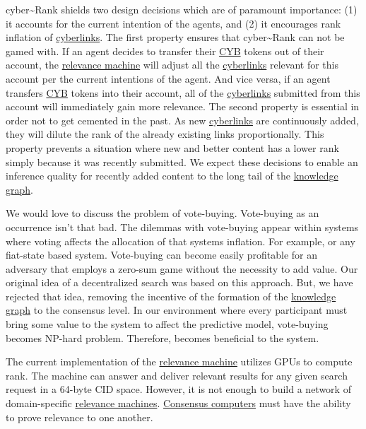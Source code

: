 \documentclass[8pt,oneside]{amsart}
\newcommand{\linkgreen}[2]{\href{#1}{\color{green}{#2}}}
\begin{document}
cyber\~{}Rank shields two design decisions which are of paramount importance: (1) it accounts for the current intention of the agents, and (2) it encourages rank inflation of {\hyperref[cyberlinks]{cyberlinks}}. The first property ensures that cyber\~{}Rank can not be gamed with. If an agent decides to transfer their {\hyperref[cyb]{CYB}} tokens out of their account, the {\hyperref[relevance-machine]{relevance machine}} will adjust all the {\hyperref[cyberlinks]{cyberlinks}} relevant for this account per the current intentions of the agent. And vice versa, if an agent transfers {\hyperref[cyb]{CYB}} tokens into their account, all of the {\hyperref[cyberlinks]{cyberlinks}} submitted from this account will immediately gain more relevance. The second property is essential in order not to get cemented in the past. As new {\hyperref[cyberlinks]{cyberlinks}} are continuously added, they will dilute the rank of the already existing links proportionally. This property prevents a situation where new and better content has a lower rank simply because it was recently submitted. We expect these decisions to enable an inference quality for recently added content to the long tail of the {\hyperref[knowledge-graph]{knowledge graph}}.

We would love to discuss the problem of vote-buying. Vote-buying as an occurrence isn't that bad. The dilemmas with vote-buying appear within systems where voting affects the allocation of that systems inflation. For example, \linkgreen{http://ipfs.io/ipfs/QmepU77tqMAHHuiSASUvUnu8f8ENuPF2Kfs97WjLn8vAS3}{Steem}
or any fiat-state based system. Vote-buying can become easily profitable for an adversary that employs a zero-sum game without the necessity to add value. Our original idea of a decentralized search was based on this approach. But, we have rejected that idea, removing the incentive of the formation of the {\hyperref[knowledge-graph]{knowledge graph}} to the consensus level. In our environment where every participant must bring some value to the system to affect the predictive model, vote-buying becomes NP-hard problem. Therefore, becomes beneficial to the system.

The current implementation of the {\hyperref[relevance-machine]{relevance machine}} utilizes GPUs to compute rank. The machine can answer and deliver relevant results for any given search request in a 64-byte CID space. However, it is not enough to build a network of domain-specific {\hyperref[relevance-machine]{relevance machines}}. {\hyperref[consensus-computer]{Consensus computers}} must have the ability to prove relevance to one another.
\end{document}
